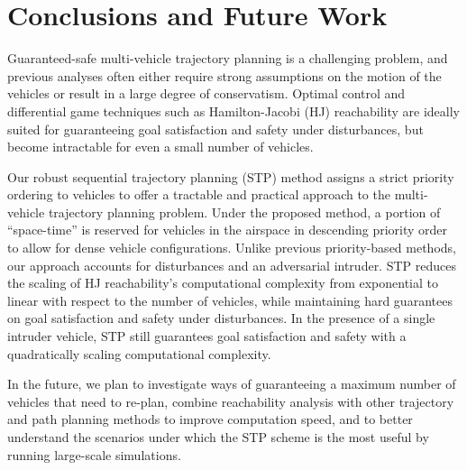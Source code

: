 \section{Conclusions and Future Work}
Guaranteed-safe multi-vehicle trajectory planning is a challenging problem, and previous analyses often either require strong assumptions on the motion of the vehicles or result in a large degree of conservatism. Optimal control and differential game techniques such as Hamilton-Jacobi (HJ) reachability are ideally suited for guaranteeing goal satisfaction and safety under disturbances, but become intractable for even a small number of vehicles.

Our robust sequential trajectory planning (STP) method assigns a strict priority ordering to vehicles to offer a tractable and practical approach to the multi-vehicle trajectory planning problem. Under the proposed method, a portion of ``space-time'' is reserved for vehicles in the airspace in descending priority order to allow for dense vehicle configurations. Unlike previous priority-based methods, our approach accounts for disturbances and an adversarial intruder. STP reduces the scaling of HJ reachability's computational complexity from exponential to linear with respect to the number of vehicles, while maintaining hard guarantees on goal satisfaction and safety under disturbances. In the presence of a single intruder vehicle, STP still guarantees goal satisfaction and safety with a quadratically scaling computational complexity.

In the future, we plan to investigate ways of guaranteeing a maximum number of vehicles that need to re-plan, combine reachability analysis with other trajectory and path planning methods to improve computation speed, and to better understand the scenarios under which the STP scheme is the most useful by running large-scale simulations.